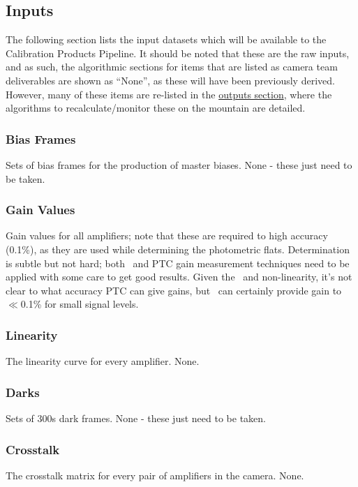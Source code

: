 \subsection{Inputs}
\label{sec:calibInputs} 
The following section lists the input datasets which will be available to the Calibration Products Pipeline. It should be noted that these are the raw inputs, and as such, the algorithmic sections for items that are listed as camera team deliverables are shown as ``None'', as these will have been previously derived. However, many of these items are re-listed in the \hyperlink{sec:calibrationOutputDatasets}{outputs section}, where the algorithms to recalculate/monitor these on the mountain are detailed.


\subsubsection{Bias Frames}\label{sec:calibInputs:biases} 
Sets of bias frames for the production of master biases.
\alg None - these just need to be taken.


\subsubsection{Gain Values}\label{sec:calibInputs:gain} 
\cameraTeam
Gain values for all amplifiers; note that these are required to high accuracy (0.1\%), as they are used while determining the photometric flats.
\alg Determination is subtle but not hard; both \fefiftyfive\ and PTC gain measurement techniques need to be applied with some care to get good results. Given the \bfeffect\ and non-linearity, it's not clear to what accuracy PTC can give gains, but \fefiftyfive\ can certainly provide gain to $\ll$0.1\% for small signal levels.


\subsubsection{Linearity}\label{sec:calibInputs:linearityCurve} 
\cameraTeam
The linearity curve for every amplifier.
\alg None.


\subsubsection{Darks}\label{sec:calibInputs:dark}
Sets of 300s dark frames.
\alg None - these just need to be taken.


\subsubsection{Crosstalk}\label{sec:calibInputs:crosstalk}
\cameraTeam
The crosstalk matrix for every pair of amplifiers in the camera.
\alg None.


